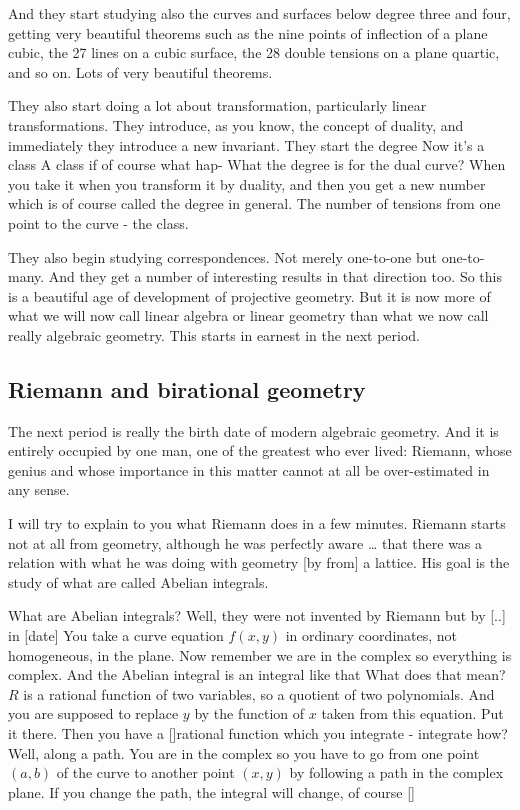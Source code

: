 \documentclass{article}
\begin{document}
And they start studying also 
the curves and surfaces below degree three and four,
getting very beautiful theorems 
such as the nine points of inflection of a plane cubic,
the 27 lines on a cubic surface,
the 28 double tensions on a plane quartic, 
and so on.
Lots of very beautiful theorems. 

They also start doing a lot about transformation, particularly linear transformations.
They introduce, as you know, the concept of duality,
and immediately they introduce a new invariant. 
They start the degree Now it's a class
A class if of course what hap- 
What the degree is for the dual curve?
When you take it when you transform it by duality,
and then you get a new number
which is of course called the degree in general.
The number of tensions from one point to the curve - the class.

They also begin studying correspondences. 
Not merely one-to-one but one-to-many.
And they get a number of interesting results 
in that direction too.
So this is a beautiful age of development 
of projective geometry.
But it is now more of what we will now call 
linear algebra or linear geometry
than what we now call really algebraic geometry.
This starts in earnest in the next period.

\subsection{Riemann and birational geometry}
The next period is really the birth date 
of modern algebraic geometry.
And it is entirely occupied by one man,
one of the greatest who ever lived: Riemann, 
whose genius and whose importance in this matter 
cannot at all be over-estimated in any sense.

I will try to explain to you what Riemann does in a few minutes.
Riemann starts not at all from geometry, 
although he was perfectly aware … 
that there was a relation with 
what he was doing with geometry [by from] a lattice.
His goal is the study of what are called Abelian integrals.

What are Abelian integrals?
Well, they were not invented by Riemann but by [..] in [date]
You take a curve equation $f(x, y)$ 
in ordinary coordinates, not homogeneous, 
in the plane.
Now remember we are in the complex 
so everything is complex.
And the Abelian integral is an integral like that
What does that mean? 
$R$ is a rational function of two variables, 
so a  quotient of two polynomials.
And you are supposed to replace $y$ 
by the function of $x$ 
taken from this equation.
Put it there.
Then you have a []rational function 
which you integrate - integrate how?
Well, along a path.
You are in the complex 
so you have to go from one point $(a,b)$ of the curve
to another point $(x,y)$ 
by following a path in the complex plane.
If you change the path, 
the integral will change, of course []
\end{document}
